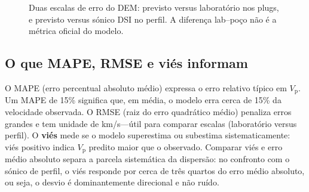 \documentclass[11pt,a4paper]{article}
\numberwithin{equation}{section}
\newcommand{\Vp}{\ensuremath{V_{\mathrm{p}}}}
\begin{document}
\begin{figure}[H]
  \centering
  \caption{Duas escalas de erro do DEM: previsto versus laboratório nos
           plugs, e previsto versus sónico DSI no perfil. A diferença
           lab--poço não é a métrica oficial do modelo.}
  \label{fig:error_scales}
\end{figure}

\subsection{O que MAPE, RMSE e viés informam}

O MAPE (erro percentual absoluto médio) expressa o erro relativo típico em
\Vp{}.
Um MAPE de 15\% significa que, em média, o modelo erra cerca de 15\% da
velocidade observada.
O RMSE (raiz do erro quadrático médio) penaliza erros grandes e tem
unidade de km/s---útil para comparar escalas (laboratório versus perfil).
O \textbf{viés} mede se o modelo superestima ou subestima sistematicamente:
viés positivo indica \Vp{} predito maior que o observado.
Comparar viés e erro médio absoluto separa a parcela sistemática da
dispersão: no confronto com o sónico de perfil, o viés responde por cerca de
três quartos do erro médio absoluto, ou seja, o desvio é dominantemente
direcional e não ruído.
\end{document}
